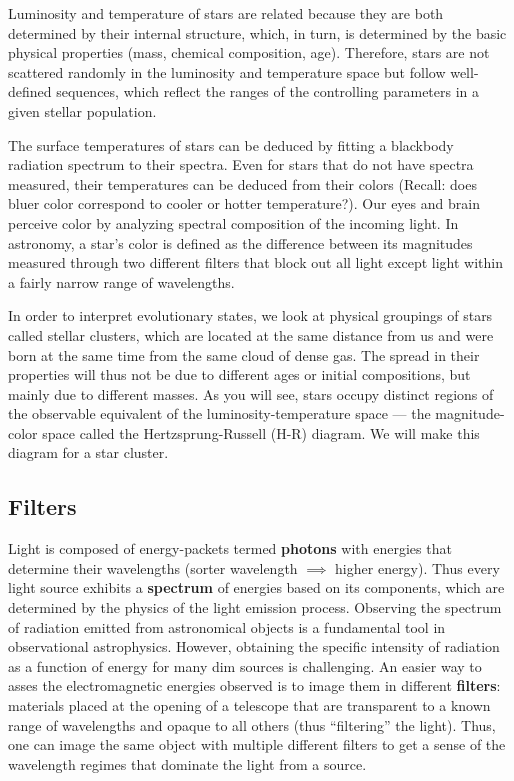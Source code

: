 Luminosity and temperature of stars are related because they are both determined by their internal structure, which, in turn, is determined by the basic physical properties (mass, chemical composition, age). Therefore, stars are not scattered randomly in the luminosity and temperature space but follow well-defined sequences, which reflect the ranges of the controlling parameters in a given stellar population. 

The surface temperatures of stars can be deduced by fitting a blackbody radiation spectrum to their spectra. Even for stars that do not have spectra measured, their temperatures can be deduced from their colors (Recall: does bluer color correspond to cooler or hotter temperature?). Our eyes and brain perceive color by analyzing spectral composition of the incoming light. In astronomy, a star's color is defined as the difference between its magnitudes measured through two different filters that block out all light except light within a fairly narrow range of wavelengths. 

In order to interpret evolutionary states, we look at physical groupings of stars called stellar clusters, which are located at the same distance from us and were born at the same time from the same cloud of dense gas. The spread in their properties will thus not be due to different ages or initial compositions, but mainly due to different masses. As you will see, stars occupy distinct regions of the observable equivalent of the luminosity-temperature space --- the magnitude-color space called the Hertzsprung-Russell (H-R) diagram. We will make this diagram for a star cluster.

\subsection{Filters}
Light is composed of energy-packets termed \textbf{photons} with energies that determine their wavelengths (sorter wavelength $\implies$ higher energy). Thus every light source exhibits a \textbf{spectrum} of energies based on its components, which are determined by the physics of the light emission process. Observing the spectrum of radiation emitted from astronomical objects is a fundamental tool in observational astrophysics. However, obtaining the specific intensity of radiation as a function of energy for many dim sources is challenging. An easier way to asses the electromagnetic energies observed is to image them in different \textbf{filters}: materials placed at the opening of a telescope that are transparent to a known range of wavelengths and opaque to all others (thus ``filtering'' the light). Thus, one can image the same object with multiple different filters to get a sense of the wavelength regimes that dominate the light from a source.

